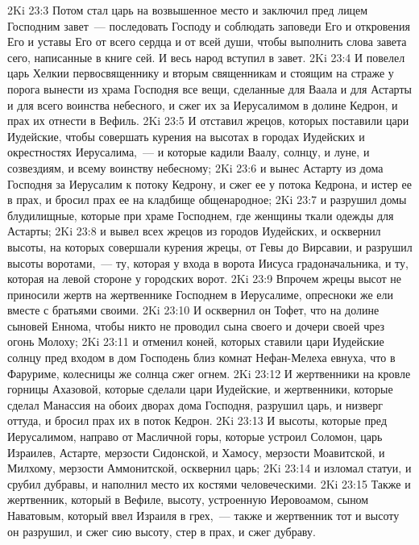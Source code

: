 \vs 2Ki 23:3 Потом стал царь на возвышенное место и заключил пред лицем Господним завет~--- последовать Господу и соблюдать заповеди Его и откровения Его и уставы Его от всего сердца и от всей души, чтобы выполнить слова завета сего, написанные в книге сей. И весь народ вступил в завет.
\rsbpar\vs 2Ki 23:4 И повелел царь Хелкии первосвященнику и вторым священникам и стоящим на страже у порога вынести из храма Господня все вещи, сделанные для Ваала и для Астарты и для всего воинства небесного, и сжег их за Иерусалимом в долине Кедрон, и  прах их отнести в Вефиль.
\vs 2Ki 23:5 И отставил жрецов, которых поставили цари Иудейские, чтобы совершать курения на высотах в городах Иудейских и окрестностях Иерусалима,~--- и которые кадили Ваалу, солнцу, и луне, и созвездиям, и всему воинству небесному;
\vs 2Ki 23:6 и вынес Астарту из дома Господня за Иерусалим к потоку Кедрону, и сжег ее у потока Кедрона, и истер ее в прах, и бросил прах ее на кладбище общенародное;
\vs 2Ki 23:7 и разрушил домы блудилищные, которые  при храме Господнем, где женщины ткали одежды для Астарты;
\vs 2Ki 23:8 и вывел всех жрецов из городов Иудейских, и осквернил высоты, на которых совершали курения жрецы, от Гевы до Вирсавии, и разрушил высоты  воротами,~--- ту, которая у входа в ворота Иисуса градоначальника, и ту, которая на левой стороне у городских ворот.
\vs 2Ki 23:9 Впрочем жрецы высот не приносили жертв на жертвеннике Господнем в Иерусалиме, опресноки же ели вместе с братьями своими.
\vs 2Ki 23:10 И осквернил он Тофет, что на долине сыновей Еннома, чтобы никто не проводил сына своего и дочери своей чрез огонь Молоху;
\vs 2Ki 23:11 и отменил коней, которых ставили цари Иудейские солнцу пред входом в дом Господень близ комнат Нефан-Мелеха евнуха, что в Фаруриме, колесницы же солнца сжег огнем.
\vs 2Ki 23:12 И жертвенники на кровле горницы Ахазовой, которые сделали цари Иудейские, и жертвенники, которые сделал Манассия на обоих дворах дома Господня, разрушил царь, и низверг оттуда, и бросил прах их в поток Кедрон.
\vs 2Ki 23:13 И высоты, которые пред Иерусалимом, направо от Масличной горы, которые устроил Соломон, царь Израилев, Астарте, мерзости Сидонской, и Хамосу, мерзости Моавитской, и Милхому, мерзости Аммонитской, осквернил царь;
\vs 2Ki 23:14 и изломал статуи, и срубил дубравы, и наполнил место их костями человеческими.
\vs 2Ki 23:15 Также и жертвенник, который в Вефиле, высоту, устроенную Иеровоамом, сыном Наватовым, который ввел Израиля в грех,~--- также и жертвенник тот и высоту он разрушил, и сжег сию высоту, стер в прах, и сжег дубраву.
